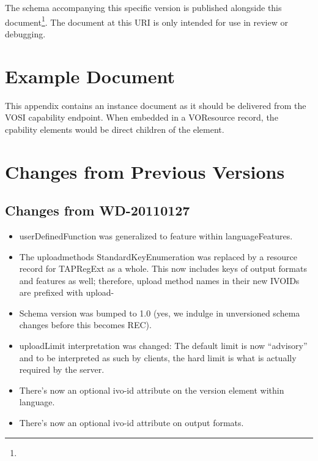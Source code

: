 \documentclass{ivoa}
\begin{document}
The schema accompanying this specific version is published alongside this
document\footnote{}.  The document at
this URI is only intended for use in review or debugging.

\section{Example Document}

\label{app:example}

This appendix contains an instance document as it should be 
delivered from the VOSI capability endpoint. When embedded in a
VOResource record, the cpability elements would be direct children of
the  element.




\section{Changes from Previous Versions}

\label{changes}


\subsection{Changes from WD-20110127}

\label{changes-20110127}

\begin{itemize}

\item userDefinedFunction was generalized to feature within languageFeatures.{}

\item The uploadmethods StandardKeyEnumeration was replaced by a
resource record for TAPRegExt as a whole.  This now includes keys of output
formats and features as well; therefore, upload method names in their new
IVOIDs are prefixed with upload-{}

\item Schema version was bumped to 1.0 (yes, we indulge in unversioned
schema changes before this becomes REC).{}

\item uploadLimit interpretation was changed: The default limit is now
``advisory'' and to be interpreted as such by clients, the hard limit
is what is actually required by the server.{}

\item There's now an optional ivo-id attribute on the version element
within language.{}

\item There's now an optional ivo-id attribute on output formats.{}

\end{itemize}
\end{document}
